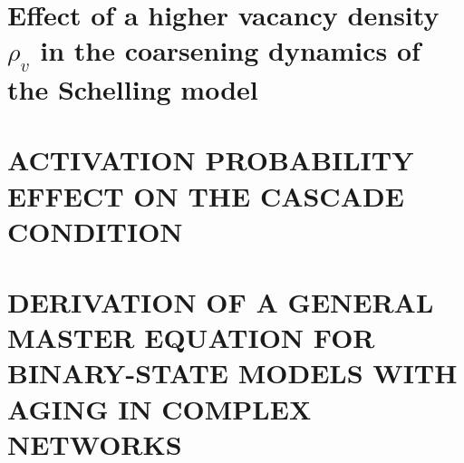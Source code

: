 \documentclass[
	11pt, %
	fleqn, %
	b5paper,
]{LegrandOrangeBook}
\begin{document}
\cleardoublepage %
{} %
\printindex %


\chapterspaceabove{6.75cm} %
\chapterspacebelow{7.25cm} %

\begin{appendices}

\renewcommand{\chaptername}{Appendix} %


\chapterspaceabove{6.75cm}
\chapterspacebelow{7.25cm}

\chapter{Effect of a higher vacancy density $\rho_{v}$ in the coarsening dynamics of the Schelling model}



\chapterspaceabove{6.75cm}
\chapterspacebelow{7.25cm}

\chapter{\label{app:Probability} ACTIVATION PROBABILITY EFFECT ON THE CASCADE CONDITION}



\chapterspaceabove{6.75cm}
\chapterspacebelow{7.25cm}

\chapter{\label{app:DERIVATION OF MASTER EQUATION WITH AGING} DERIVATION OF A GENERAL MASTER EQUATION FOR  BINARY-STATE MODELS WITH AGING IN COMPLEX NETWORKS}



\end{appendices}

\end{document}
